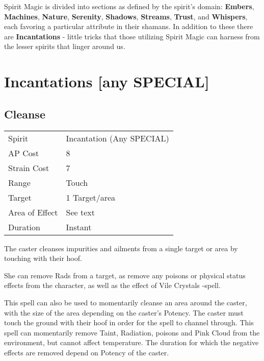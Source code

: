 \documentclass[11pt,a4paper,twocolumn]{book}
\begin{document}
Spirit Magic is divided into sections as defined by the spirit's domain: \textbf{Embers}, \textbf{Machines}, \textbf{Nature}, \textbf{Serenity}, \textbf{Shadows}, \textbf{Streams}, \textbf{Trust}, and \textbf{Whispers}, each favoring a particular attribute in their shamans. In addition to these there are \textbf{Incantations} - little tricks that those utilizing Spirit Magic can harness from the lesser spirits that linger around us.

\section*{Incantations [any SPECIAL]}

\subsection*{Cleanse}
{
	\begin{tabu} to 75mm{| X[l,4] | X[l,7] |}
		\hline
		Spirit         & Incantation (Any SPECIAL) \\
		AP Cost        & 8                         \\
		Strain Cost    & 7                         \\
		Range          & Touch                     \\
		Target         & 1 Target/area             \\
		Area of Effect & See text                  \\
		Duration       & Instant                   \\ \hline
	\end{tabu}
	
}

\medskip

The caster cleanses impurities and ailments from a single target or area by touching with their hoof. 

She can remove Rads from a target, as remove any poisons or physical status effects from the character, as well as the effect of Vile Crystals -spell. 

This spell can also be used to momentarily cleanse an area around the caster, with the size of the area depending on the caster's Potency. The caster must touch the ground with their hoof in order for the spell to channel through. 
This spell can momentarily remove Taint, Radiation, poisons and Pink Cloud from the environment, but cannot affect temperature. The duration for which the negative effects are removed depend on Potency of the caster.
\end{document}

